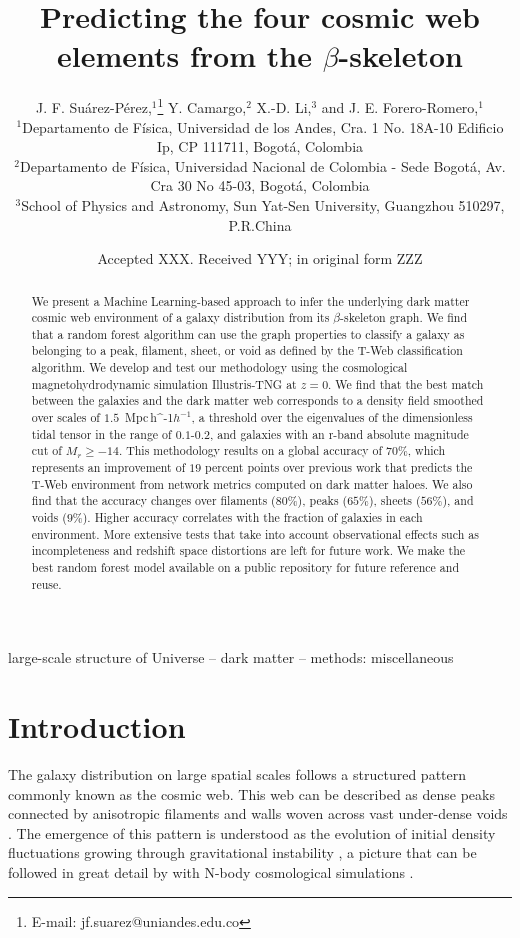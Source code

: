 \documentclass[usenatbib]{mnras}
\title[Cosmic web elements and the $\beta$-skeleton]{Predicting the four cosmic web
  elements from the $\beta$-skeleton}
\author[J. F. Su\'arez-P\'erez et al.]{
J. F. Su\'arez-P\'erez,$^{1}$\thanks{E-mail: jf.suarez@uniandes.edu.co}
Y. Camargo,$^{2}$ 
X.-D. Li,$^{3}$
and J. E. Forero-Romero,$^{1}$
\\
$^{1}$Departamento de F\'isica, Universidad de los Andes, Cra. 1
No. 18A-10 Edificio Ip, CP 111711, Bogot\'a, Colombia\\ 
$^{2}$Departamento de F\'isica, Universidad Nacional de Colombia -
Sede Bogot\'a, Av. Cra 30 No 45-03, Bogot\'a, Colombia\\ 
$^{3}$School of Physics and Astronomy, Sun Yat-Sen University,
Guangzhou 510297, P.R.China\\ 
}
\date{Accepted XXX. Received YYY; in original form ZZZ}
\newcommand{\Mpch}{\,{\rm Mpc}\,\ifmmode h^{-1}\else $h^{-1}$\fi}
\begin{document}
\label{firstpage}
\pagerange{\pageref{firstpage}--\pageref{lastpage}}
\maketitle

\begin{abstract}
We present a Machine Learning-based approach to infer the underlying dark matter cosmic web environment of a galaxy distribution from its $\beta$-skeleton graph.
We find that a random forest algorithm can use the graph properties to classify a galaxy as belonging to a peak, filament, sheet, or void as defined by the T-Web classification algorithm.
We develop and test our methodology using the cosmological magnetohydrodynamic simulation Illustris-TNG at $z=0$.
We find that the best match between the galaxies and the dark matter web corresponds to a density field smoothed over scales of $1.5$ \Mpch, a threshold over the eigenvalues of the dimensionless tidal tensor in the range of $0.1$-$0.2$, and galaxies with an r-band absolute magnitude cut of $M_r\geq-14$.
This methodology results on a global accuracy of $70\%$, which represents an improvement of $19$ percent points over previous work that predicts the T-Web environment from network metrics computed on dark matter haloes.
We also find that the accuracy changes over filaments ($80\%$), peaks ($65\%$), sheets ($56\%$), and voids ($9\%$).
Higher accuracy correlates with the fraction of galaxies in each environment.
More extensive tests that take into account observational effects such as incompleteness and redshift space distortions are left for future work.
We make the best random forest model available on a public repository for future reference and reuse.
\end{abstract}

\begin{keywords}
large-scale structure of Universe -- dark matter -- methods: miscellaneous
\end{keywords}


\section{Introduction}
The galaxy distribution on large spatial scales follows a structured 
pattern commonly known as the cosmic web. 
This web can be described as dense peaks connected by anisotropic
filaments and walls woven across vast under-dense voids 
\citep{Bond1996}.  
The emergence of this pattern is understood as the evolution of
initial density fluctuations growing through gravitational instability
\citep{ZelDovich1970,White1987}, a picture that can be followed in
great detail by with N-body cosmological simulations
\citep{Schmalzing1999,Vogelsberger2014}.     
\end{document}
